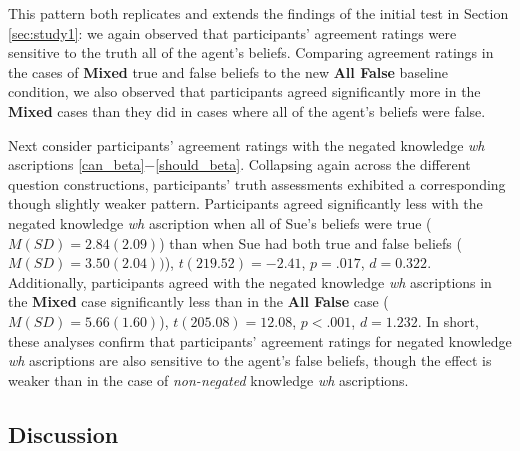 \documentclass[a4paper]{article}
\begin{document}
This pattern both replicates and extends the findings of the initial test in Section \ref{sec:study1}: we again observed that participants' agreement ratings were sensitive to the truth all of the agent's beliefs. Comparing agreement ratings in the cases of \textbf{Mixed} true and false beliefs to the new \textbf{All False} baseline condition, we also observed that participants agreed significantly more in the \textbf{Mixed} cases than they did in cases where all of the agent's beliefs were false.

Next consider participants' agreement ratings with the negated knowledge \textit{wh} ascriptions \ref{can_beta}$-$\ref{should_beta}. Collapsing again across the different question constructions, participants' truth assessments exhibited a corresponding though slightly weaker pattern. Participants agreed significantly less with the negated knowledge \textit{wh} ascription when all of Sue's beliefs were true ($M(SD) = 2.84(2.09)$) than when Sue had both true and false beliefs ($M(SD) = 3.50(2.04))$), $t(219.52) = -2.41$, $p= .017$, $d = 0.322$. Additionally, participants agreed with the negated knowledge \textit{wh} ascriptions in the \textbf{Mixed} case significantly less than in the \textbf{All False} case ($M(SD) = 5.66(1.60)$), $t(205.08) = 12.08$, $p< .001$, $d = 1.232$. In short, these analyses confirm that participants' agreement ratings for negated knowledge \textit{wh} ascriptions are also sensitive to the agent's false beliefs, though the effect is weaker than in the case of \textit{non-negated} knowledge \textit{wh} ascriptions.

\subsection{Discussion}
\end{document}
